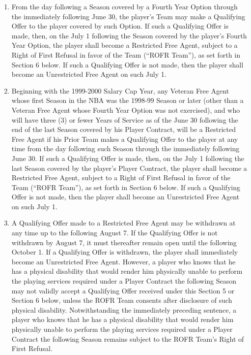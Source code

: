 \documentclass[
]{book}
\providecommand{\tightlist}{%
  \setlength{\itemsep}{0pt}\setlength{\parskip}{0pt}}
\begin{document}
\begin{enumerate}
\def\labelenumi{(\alph{enumi})}
\tightlist
\item
  From the day following a Season covered by a Fourth Year Option through the immediately following June 30, the player's Team may make a Qualifying Offer to the player covered by such Option. If such a Qualifying Offer is made, then, on the July 1 following the Season covered by the player's Fourth Year Option, the player shall become a Restricted Free Agent, subject to a Right of First Refusal in favor of the Team (``ROFR Team''), as set forth in Section 6 below. If such a Qualifying Offer is not made, then the player shall become an Unrestricted Free Agent on such July 1.
\item
  Beginning with the 1999-2000 Salary Cap Year, any Veteran Free Agent whose first Season in the NBA was the 1998-99 Season or later (other than a Veteran Free Agent whose Fourth Year Option was not exercised), and who will have three (3) or fewer Years of Service as of the June 30 following the end of the last Season covered by his Player Contract, will be a Restricted Free Agent if his Prior Team makes a Qualifying Offer to the player at any time from the day following such Season through the immediately following June 30. If such a Qualifying Offer is made, then, on the July 1 following the last Season covered by the player's Player Contract, the player shall become a Restricted Free Agent, subject to a Right of First Refusal in favor of the Team (``ROFR Team''), as set forth in Section 6 below. If such a Qualifying Offer is not made, then the player shall become an Unrestricted Free Agent on such July 1.
\item
  A Qualifying Offer made to a Restricted Free Agent may be withdrawn at any time up to the following August 7. If the Qualifying Offer is not withdrawn by August 7, it must thereafter remain open until the following October 1. If a Qualifying Offer is withdrawn, the player shall immediately become an Unrestricted Free Agent. However, a player who knows that he has a physical disability that would render him physically unable to perform the playing services required under a Player Contract the following Season may not validly accept a Qualifying Offer received under this Section 5 or Section 6 below, unless the ROFR Team consents after disclosure of such physical disability. Notwithstanding the immediately preceding sentence, a player who knows that he has a physical disability that would render him physically unable to perform the playing services required under a Player Contract the following Season remains subject to the ROFR Team's Right of First Refusal.

\end{enumerate}
\end{document}
